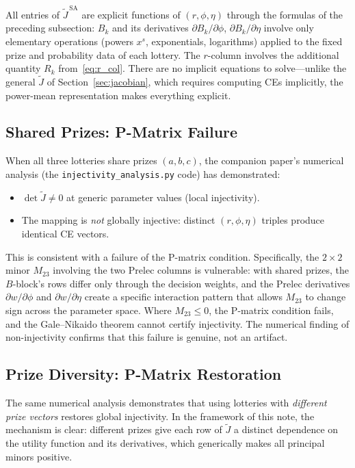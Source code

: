 \documentclass[11pt,a4paper]{article}
\theoremstyle{definition}
\begin{document}
All entries of $\widetilde{J}^{\,\mathrm{SA}}$ are explicit functions of
$(r, \phi, \eta)$ through the formulas of the preceding subsection:
$B_k$ and its derivatives $\partial B_k/\partial\phi$,
$\partial B_k/\partial\eta$ involve only elementary operations
(powers $x^s$, exponentials, logarithms) applied to the fixed prize
and probability data of each lottery. The $r$-column involves the
additional quantity $R_k$ from~\eqref{eq:r_col}. There are no implicit
equations to solve---unlike the general $\widetilde{J}$ of
Section~\ref{sec:jacobian}, which requires computing CEs implicitly,
the power-mean representation makes everything explicit.

\subsection{Shared Prizes: P-Matrix Failure}

When all three lotteries share prizes $(a, b, c)$, the companion paper's
numerical analysis (the \texttt{injectivity\_analysis.py} code) has
demonstrated:
\begin{itemize}
    \item $\det \widetilde{J} \neq 0$ at generic parameter values (local
    injectivity).
    \item The mapping is \emph{not} globally injective: distinct $(r, \phi,
    \eta)$ triples produce identical CE vectors.
\end{itemize}

This is consistent with a failure of the P-matrix condition. Specifically, the
$2 \times 2$ minor $M_{23}$ involving the two Prelec columns is vulnerable:
with shared prizes, the $B$-block's rows differ only through the decision
weights, and the Prelec derivatives
$\partial w / \partial \phi$ and $\partial w / \partial \eta$ create a
specific interaction pattern that allows $M_{23}$ to change sign across the
parameter space. Where $M_{23} \leq 0$, the P-matrix condition fails, and
the Gale--Nikaido theorem cannot certify injectivity. The numerical finding
of non-injectivity confirms that this failure is genuine, not an artifact.

\subsection{Prize Diversity: P-Matrix Restoration}

The same numerical analysis demonstrates that using lotteries with
\emph{different prize vectors} restores global injectivity. In the framework
of this note, the mechanism is clear: different prizes give each row of
$\widetilde{J}$ a distinct dependence on the utility function and its
derivatives, which generically makes all principal minors positive.
\end{document}
